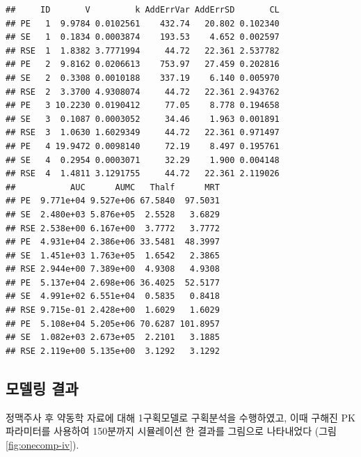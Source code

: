 \documentclass[
  11pt,
  krantz2, a4paper, twoside]{krantz}
\theoremstyle{definition}
\theoremstyle{definition}
\theoremstyle{definition}
\theoremstyle{definition}
\theoremstyle{remark}
\begin{document}
\begin{verbatim}
##     ID       V         k AddErrVar AddErrSD       CL
## PE   1  9.9784 0.0102561    432.74   20.802 0.102340
## SE   1  0.1834 0.0003874    193.53    4.652 0.002597
## RSE  1  1.8382 3.7771994     44.72   22.361 2.537782
## PE   2  9.8162 0.0206613    753.97   27.459 0.202816
## SE   2  0.3308 0.0010188    337.19    6.140 0.005970
## RSE  2  3.3700 4.9308074     44.72   22.361 2.943762
## PE   3 10.2230 0.0190412     77.05    8.778 0.194658
## SE   3  0.1087 0.0003052     34.46    1.963 0.001891
## RSE  3  1.0630 1.6029349     44.72   22.361 0.971497
## PE   4 19.9472 0.0098140     72.19    8.497 0.195761
## SE   4  0.2954 0.0003071     32.29    1.900 0.004148
## RSE  4  1.4811 3.1291755     44.72   22.361 2.119026
##           AUC      AUMC   Thalf      MRT
## PE  9.771e+04 9.527e+06 67.5840  97.5031
## SE  2.480e+03 5.876e+05  2.5528   3.6829
## RSE 2.538e+00 6.167e+00  3.7772   3.7772
## PE  4.931e+04 2.386e+06 33.5481  48.3997
## SE  1.451e+03 1.763e+05  1.6542   2.3865
## RSE 2.944e+00 7.389e+00  4.9308   4.9308
## PE  5.137e+04 2.698e+06 36.4025  52.5177
## SE  4.991e+02 6.551e+04  0.5835   0.8418
## RSE 9.715e-01 2.428e+00  1.6029   1.6029
## PE  5.108e+04 5.205e+06 70.6287 101.8957
## SE  1.082e+03 2.673e+05  2.2101   3.1885
## RSE 2.119e+00 5.135e+00  3.1292   3.1292
\end{verbatim}

\hypertarget{uxbaa8uxb378uxb9c1-uxacb0uxacfc-1}{%
\subsection{모델링 결과}\label{uxbaa8uxb378uxb9c1-uxacb0uxacfc-1}}

정맥주사 후 약동학 자료에 대해 1구획모델로 구획분석을 수행하였고, 이때 구해진 PK 파라미터를 사용하여 150분까지 시뮬레이션 한 결과를 그림으로 나타내었다 (그림 \ref{fig:onecomp-iv}). 

\small
\end{document}
